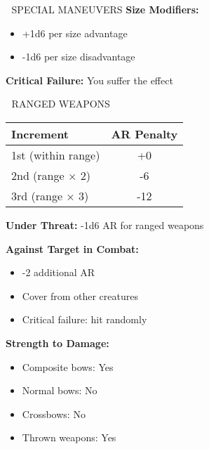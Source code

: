 \documentclass[10pt,a4paper,landscape]{article}
\begin{document}
\begin{multicols}{4}
\begin{mainsection}{🤺 SPECIAL MANEUVERS}
			\textbf{Size Modifiers:}
			\begin{itemize}[noitemsep,leftmargin=8pt]
				\item +1d6 per size advantage
				\item -1d6 per size disadvantage
			\end{itemize}
			
			\textbf{Critical Failure:} You suffer the effect
		\end{mainsection}
		
		\begin{mainsection}{🏹 RANGED WEAPONS}
			\begin{tabular}{@{}lc@{}}
				\toprule
				\textbf{Increment} & \textbf{AR Penalty} \\
				\midrule
				1st (within range) & +0 \\
				2nd (range × 2) & -6 \\
				3rd (range × 3) & -12 \\
				\bottomrule
			\end{tabular}
			\medskip
			\textbf{Under Threat:} -1d6 AR for ranged weapons
			
			\textbf{Against Target in Combat:}
			\begin{itemize}[noitemsep,leftmargin=8pt]
				\item -2 additional AR
				\item Cover from other creatures
				\item Critical failure: hit randomly
			\end{itemize}
			
			\textbf{Strength to Damage:}
			\begin{itemize}[noitemsep,leftmargin=8pt]
				\item Composite bows: Yes
				\item Normal bows: No
				\item Crossbows: No
				\item Thrown weapons: Yes
			\end{itemize}
		\end{mainsection}
		
		\columnbreak
		

\end{multicols}
\end{document}
